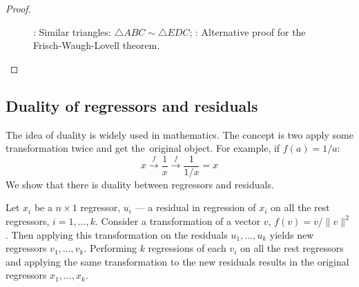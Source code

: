 \begin{proof}
\begin{figure}[ht!]
\begin{center}
\caption{: Similar triangles: $\bigtriangleup ABC \sim \bigtriangleup EDC$;
: Alternative proof for the Frisch-Waugh-Lovell theorem.}
\end{center}
\end{figure}
\end{proof}


\subsection{Duality of regressors and residuals}

The idea of duality is widely used in mathematics.
The concept is two apply some transformation twice and get the~original object.
For example, if $f(a) = 1/a$:
\[
x \stackrel{f}{\to} \frac{1}{x} \stackrel{f}{\to} \frac{1}{1/x} = x
\]
We show that there is duality between regressors and residuals.

\begin{theorem}
Let $x_i$ be a $n \times 1$ regressor,
$u_i$ — a residual in regression of $x_i$ on all the rest regressors,  $i = 1, \ldots, k$.
Consider a transformation of a vector $v$, $f(v) = v/\lVert v \rVert^2$.
Then applying this transformation on the residuals $u_1, \ldots, u_k$ yields
new regressors $v_1, \ldots, v_k$.
Performing $k$ regressions of each $v_i$ on all the rest regressors and
applying the same transformation to the new residuals results in
the original regressors $x_1, \ldots, x_k$.
\end{theorem}

